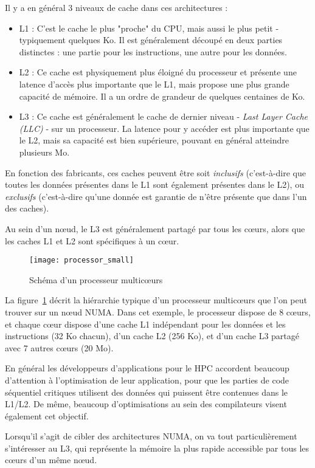 Il y a en général 3 niveaux de cache dans ces architectures :
\begin{itemize}
  \item L1 : C'est le cache le plus "proche" du CPU, mais aussi le plus petit - typiquement quelques Ko. Il est généralement découpé en deux parties distinctes : une partie pour les instructions, une autre pour les données.
  \item L2 : Ce cache est physiquement plus éloigné du processeur et présente une latence d'accès plus importante que le L1, mais propose une plus grande capacité de mémoire. Il a un ordre de grandeur de quelques centaines de Ko.
  \item L3 : Ce cache est généralement le cache de dernier niveau - \emph{Last Layer Cache (LLC)} - sur un processeur. La latence pour y accéder est plus importante que le L2, mais sa capacité est bien supérieure, pouvant en général atteindre plusieurs Mo.
\end{itemize}

En fonction des fabricants, ces caches peuvent être soit \emph{inclusifs} (c'est-à-dire que toutes les données présentes dans le L1 sont également présentes dans le L2), ou \emph{exclusifs} (c'est-à-dire qu'une donnée est garantie de n'être présente que dans l'un des caches).

Au sein d'un nœud, le L3 est généralement partagé par tous les cœurs, alors que les caches L1 et L2 sont spécifiques à un cœur.

\begin{figure}[ht]
  \centering
  \texttt{[image: processor\_small]}
  \caption{Schéma d'un processeur multicœurs}\label{fig:context:schema-caches}
\end{figure}

La figure~\ref{fig:context:schema-caches} décrit la hiérarchie typique d'un processeur multicœurs que l'on peut trouver sur un nœud NUMA.
Dans cet exemple, le processeur dispose de 8 cœurs, et chaque cœur dispose d'une cache L1 indépendant pour les données et les instructions (32 Ko chacun), d'un cache L2 (256 Ko), et d'un cache L3 partagé avec 7 autres cœurs (20 Mo).


En général les développeurs d'applications pour le HPC accordent beaucoup d'attention à l'optimisation de leur application, pour que les parties de code séquentiel critiques utilisent des données qui puissent être contenues dans le L1/L2.
De même, beaucoup d'optimisations au sein des compilateurs visent également cet objectif.

Lorsqu'il s'agit de cibler des architectures NUMA, on va tout particulièrement s'intéresser au L3, qui représente la mémoire la plus rapide accessible par tous les cœurs d'un même nœud.

